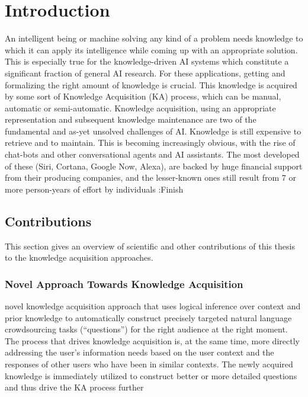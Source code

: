 % 
\chapter{Introduction}
An intelligent being or machine solving any kind of a problem needs knowledge to which it can apply its intelligence while coming up with an appropriate solution. This is especially true for the knowledge-driven AI systems which constitute a significant fraction of general AI research. For these applications, getting and formalizing the right amount of knowledge is crucial. This knowledge is acquired by some sort of Knowledge Acquisition (KA) process, which can be manual, automatic or semi-automatic. Knowledge acquisition, using an appropriate representation and subsequent knowledge maintenance are two of the fundamental and as-yet unsolved challenges of AI. Knowledge is still expensive to retrieve and to maintain. This is becoming increasingly obvious, with the rise of chat-bots and other conversational agents and AI assistants. The most developed of these (Siri, Cortana, Google Now, Alexa), are backed by huge financial support from their producing companies, and the lesser-known ones still result from 7 or more person-years of effort by individuals
\todo:{Finish}

\section{Contributions}
This section gives an overview of scientific and other contributions of this thesis to the knowledge acquisition approaches.

\subsection{Novel Approach Towards Knowledge Acquisition}
novel knowledge acquisition approach that uses logical inference over context and prior knowledge to automatically construct precisely targeted natural language crowdsourcing tasks (“questions”) for the right audience at the right moment. The process that drives knowledge acquisition is, at the same time, more directly addressing the user’s information needs based on the user context and the responses of other users who have been in similar contexts. The newly acquired knowledge is immediately utilized to construct better or more detailed questions and thus drive the KA process further

